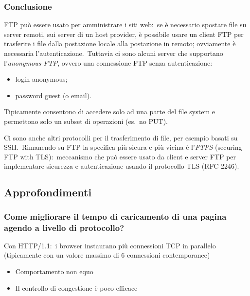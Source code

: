 \subsubsection{Conclusione}

FTP può essere usato per amministrare i siti web:\ se è necessario spostare file su server remoti, sui server di un host provider, è possibile usare un client FTP per trasferire i file dalla postazione locale alla postazione in remoto; ovviamente è necessaria l'autenticazione.\
Tuttavia ci sono alcuni server che supportano l'\emph{anonymous FTP}, ovvero una connessione FTP senza autenticazione:

\begin{itemize}
    \item login anonymous;
    \item password guest (o email).
\end{itemize}
Tipicamente consentono di accedere solo ad una parte del file system e permettono solo un subset di operazioni (es.\ no PUT).

Ci sono anche altri protocolli per il trasferimento di file, per esempio basati su SSH.\
Rimanendo su FTP la specifica più sicura e più vicina è l'\emph{FTPS} (securing FTP with TLS):\ meccanismo che può essere usato da client e server FTP per implementare sicurezza e autenticazione usando il protocollo TLS (RFC 2246).

\subsection{Approfondimenti}

\subsubsection{Come migliorare il tempo di caricamento di una pagina agendo a livello di protocollo?}

Con HTTP/1.1:\ i browser instaurano più connessioni TCP in parallelo (tipicamente con un valore massimo di 6 connessioni contemporanee)

\begin{itemize}
    \item Comportamento non equo
    \item Il controllo di congestione è poco efficace
\end{itemize}

